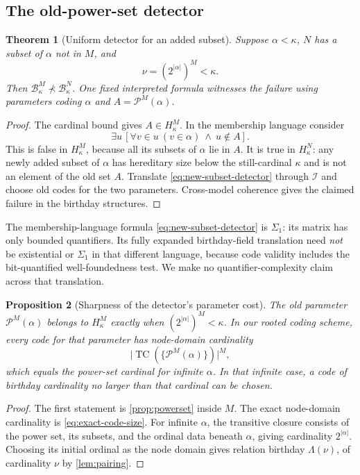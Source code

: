 \documentclass[11pt,letterpaper]{article}
\newtheorem{theorem}{Theorem}[section]
\newtheorem{proposition}[theorem]{Proposition}
\theoremstyle{definition}
\theoremstyle{remark}
\newcommand{\TC}{\operatorname{TC}}
\newcommand{\B}{\mathcal B}
\newcommand{\I}{\mathcal I}
\newcommand{\Pow}{\mathcal P}
\newcommand{\card}[1]{\lvert#1\rvert}
\begin{document}
\subsection{The old-power-set detector}

\begin{theorem}[Uniform detector for an added subset]
\label{thm:detector}
Suppose $\alpha<\kappa$, $N$ has a subset of $\alpha$ not in $M$, and
\[
 \nu=(2^{\card\alpha})^M<\kappa.
\]
Then $\B_\kappa^M\not\prec\B_\kappa^N$. One fixed interpreted formula
witnesses the failure using parameters coding $\alpha$ and
$A=\Pow^M(\alpha)$.
\end{theorem}
\begin{proof}
The cardinal bound gives $A\in H_\kappa^M$. In the membership language
consider
\begin{equation}
 \exists u\,[\forall v\in u\ (v\in\alpha)\ \land\ u\notin A].
 \label{eq:new-subset-detector}
\end{equation}
This is false in $H_\kappa^M$, because all its subsets of $\alpha$ lie in
$A$. It is true in $H_\kappa^N$: any newly added subset of $\alpha$ has
hereditary size below the still-cardinal $\kappa$ and is not an element of
the old set $A$. Translate \eqref{eq:new-subset-detector} through $\I$ and
choose old codes for the two parameters. Cross-model coherence gives the
claimed failure in the birthday structures.
\end{proof}

The membership-language formula \eqref{eq:new-subset-detector} is
$\Sigma_1$: its matrix has only bounded quantifiers. Its fully expanded
birthday-field translation need \emph{not} be existential or $\Sigma_1$ in
that different language, because code validity includes the bit-quantified
well-foundedness test. We make no quantifier-complexity claim across that
translation.

\begin{proposition}[Sharpness of the detector's parameter cost]
\label{prop:detector-cost}
The old parameter $\Pow^M(\alpha)$ belongs to $H_\kappa^M$ exactly when
$(2^{\card\alpha})^M<\kappa$. In our rooted coding scheme, every code for
that parameter has node-domain cardinality
\[
 \card{\TC(\{\Pow^M(\alpha)\})}^M,
\]
which equals the power-set cardinal for infinite $\alpha$. In that infinite case, a code of
birthday cardinality no larger than that cardinal can be chosen.
\end{proposition}
\begin{proof}
The first statement is \cref{prop:powerset} inside $M$. The exact
node-domain cardinality is \eqref{eq:exact-code-size}. For infinite
$\alpha$, the transitive closure consists of the power set, its subsets,
and the ordinal data beneath $\alpha$, giving cardinality
$2^{\card\alpha}$. Choosing its initial ordinal as the node domain gives
relation birthday $\Lambda(\nu)$, of cardinality $\nu$ by
\cref{lem:pairing}.
\end{proof}
\end{document}

